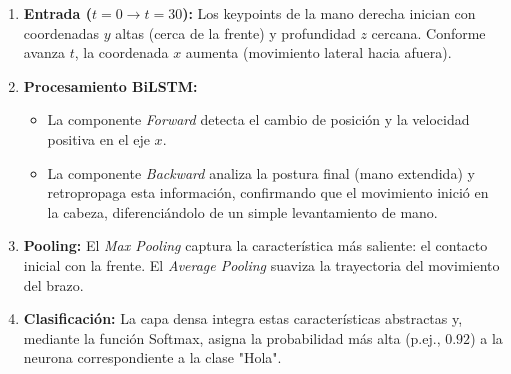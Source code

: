 \begin{enumerate}
    \item \textbf{Entrada ($t=0 \to t=30$):} Los keypoints de la mano derecha inician con coordenadas $y$ altas (cerca de la frente) y profundidad $z$ cercana. Conforme avanza $t$, la coordenada $x$ aumenta (movimiento lateral hacia afuera).
    \item \textbf{Procesamiento BiLSTM:}
    \begin{itemize}
        \item La componente \textit{Forward} detecta el cambio de posición y la velocidad positiva en el eje $x$.
        \item La componente \textit{Backward} analiza la postura final (mano extendida) y retropropaga esta información, confirmando que el movimiento inició en la cabeza, diferenciándolo de un simple levantamiento de mano.
    \end{itemize}
    \item \textbf{Pooling:} El \textit{Max Pooling} captura la característica más saliente: el contacto inicial con la frente. El \textit{Average Pooling} suaviza la trayectoria del movimiento del brazo.
    \item \textbf{Clasificación:} La capa densa integra estas características abstractas y, mediante la función Softmax, asigna la probabilidad más alta (p.ej., $0.92$) a la neurona correspondiente a la clase "Hola".
\end{enumerate}

